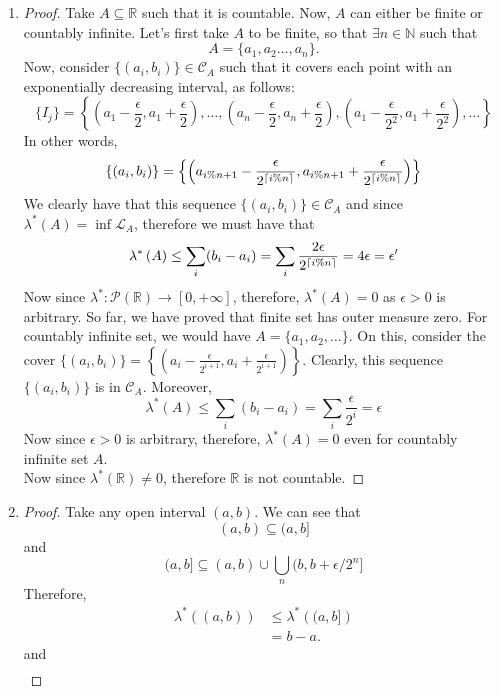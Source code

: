 \documentclass{article}
\theoremstyle{definition}
\theoremstyle{remark}
\theoremstyle{definition}
\theoremstyle{definition}
\theoremstyle{definition}
\newcommand{\union}{\cup}
\newcommand{\bunion}{\bigcup}
\newcommand{\R}{\mathbb{R}}
\newcommand{\N}{\mathbb{N}}
\newcommand{\pow}[1]{\mathscr{P}\left (#1\right )}
\newcommand{\lom}[1]{\lambda^*\left (#1\right )}
\newcommand{\set}[1]{\mathscr{#1}}
\DeclarePairedDelimiter{\ceil}{\lceil}{\rceil}
\begin{document}
\begin{enumerate}
{\begin{proof}
\end{proof}}
\item {\begin{proof}
		Take $ A\subseteq \R $ such that it is countable. Now, $ A $ can either be finite or countably infinite. Let's first take $ A $ to be finite, so that $ \exists n\in \N $ such that
		\[A = \{a_1,a_2\dots,a_n\}.\]
		Now, consider $ \{(a_i,b_i)\} \in \set{C}_A$ such that it covers each point with an exponentially decreasing interval, as follows:
		\[\{I_j\} = \left \{(a_1-\frac{\epsilon}{2},a_1 + \frac{\epsilon}{2} ), \dots, (a_n - \frac{\epsilon}{2},a_n + \frac{\epsilon}{2}), (a_1 -\frac{\epsilon}{2^2},a_1 + \frac{\epsilon}{2^2}),\dots\right \}\]
		In other words,
		\[\{(a_i,b_i)\} = \left \{ \left (a_{i\%n + 1} - \frac{\epsilon}{2^{\ceil{i\% n}}}, a_{i\%n + 1} + \frac{\epsilon}{2^{\ceil{i\% n}}}\right ) \right \}\]
		We clearly have that this sequence $ \{(a_i,b_i)\}\in \set{C}_A $ and since $ \lom{A} = \inf \set{L}_A $, therefore we must have that 
		\[\lom{A} \le \sum_{i} (b_i - a_i) = \sum_i \frac{2\epsilon}{2^{\ceil{i\%n}}}= 4\epsilon = \epsilon^\prime\]
		Now since $ \lambda^* : \pow{\R} \to [0,+\infty] $, therefore, $ \lom{A} = 0 $ as $ \epsilon >0$ is arbitrary. So far, we have proved that finite set has outer measure zero. For countably infinite set, we would have $ A = \{a_1,a_2,\dots\} $. On this, consider the cover $ \{(a_i,b_i)\} = \left \{\left ( a_i - \frac{\epsilon}{2^{i+1}}, a_i + \frac{\epsilon}{2^{i+1}} \right )\right \} $. Clearly, this sequence $ \{(a_i,b_i)\} $ is in $ \set{C}_A $. Moreover,
		\[\lom{A} \le \sum_i (b_i - a_i) = \sum_i \frac{\epsilon}{2^i} = \epsilon\]
		Now since $ \epsilon >0 $ is arbitrary, therefore, $ \lom{A} = 0 $ even for countably infinite set $ A $.\\
		Now since $ \lom{\R} \neq 0 $, therefore $ \R $ is not countable.
\end{proof}}
\item {\begin{proof}
		Take any open interval $ (a,b) $. We can see that 
		\[ (a,b) \subseteq (a,b]  \]
		and
		\[(a,b] \subseteq (a,b) \union \bunion_n (b,b+\epsilon/2^n]\]
		Therefore,
		\begin{equation*}
			\begin{split}
				\lom{(a,b)} &\le \lom{(a,b]}\\
				&= b-a.
			\end{split}
		\end{equation*}
		and
		\begin{equation*}
			\begin{split}

\end{split}
\end{equation*}
\end{proof}}
\end{enumerate}
\end{document}
